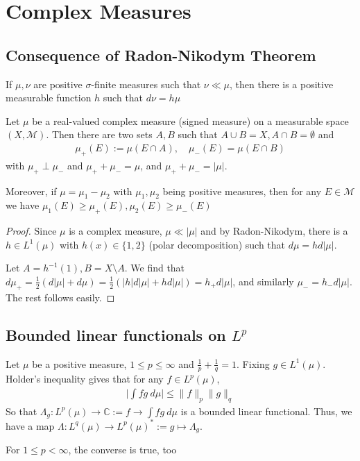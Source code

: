 
\chapter{Complex Measures}


\section{Consequence of Radon-Nikodym Theorem}

\begin{theorem}
  If $\mu, \nu$ are positive $\sigma$-finite measures such that $\nu
  \ll \mu$, then there is a positive measurable function $h$ such that
  $d \nu = h \mu$
\end{theorem}

\begin{theorem}
  Let $\mu$ be a real-valued complex measure (signed measure) on a
  measurable space
  $(X, \mathcal{M})$. Then there are two sets $A, B$ such that $A
  \cup B = X, A \cap B = \emptyset$ and
  \begin{align*}
    \mu_+(E) := \mu( E \cap A), \quad \mu_-(E) = \mu(E \cap B)
  \end{align*}
  with $ \mu_+ \perp \mu_-$ and $ \mu_+ + \mu_- = \mu$, and $\mu_+ +
  \mu_- = |\mu|$.

  Moreover, if $   \mu = \mu_1 - \mu_2$ with $ \mu_1 , \mu_2$ being
  positive measures, then for any $E \in \mathcal{M}$ we have
  $\mu_1(E) \ge \mu_+(E), \mu_2(E) \ge \mu_-(E)$
\end{theorem}
\begin{proof}
  Since $\mu$ is a complex measure, $\mu \ll |\mu|$ and by
  Radon-Nikodym, there is a $h \in L^{1}(\mu)$ with $h(x) \in \{ 1, 2  \}$
  (polar decomposition) such that $d \mu = h d |\mu|$.

  Let $A = h^{-1}(1), B = X \setminus A$. We find that $d\mu_+ =
  \frac{1}{2}(d|\mu| + d\mu) = \frac{1}{2}(|h| d |\mu| + h d |\mu|) = h_+
  d |\mu|$,  and similarly $\mu_- = h_- d |\mu|$. The rest follows easily.
\end{proof}

\section{Bounded linear functionals on $L^p$}

\begin{note}
  Let $\mu$ be a positive measure, $1 \le p \le \infty$ and
  $\frac{1}{p} + \frac{1}{q} = 1$. Fixing $ g \in L^{1}(\mu)$.
  Holder's inequality gives that for any $ f \in L^{p}(\mu)$,
  \begin{align*}
    \big|\int fg \ d \mu\big| \le \|f\|_p \|g\|_q
  \end{align*}
  So that $\Lambda_g : L^{p}(\mu) \to \mathbb{C} := f \to \int fg \ d
  \mu$ is a bounded linear functional. Thus, we have a map $\Lambda :
  L^{q}(\mu) \to L^{p}(\mu)^* := g \mapsto \Lambda_g$.

  For $1 \le p < \infty$, the converse is true, too
\end{note}

